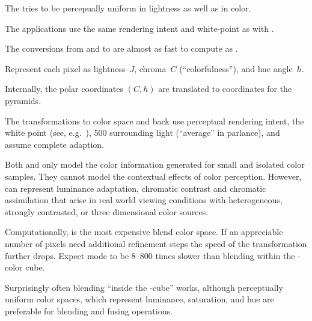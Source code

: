 \begin{description}
  The  tries to be percepually uniform
  in lightness as well as in color.

  The applications use the same rendering intent and white-point as with .

  The conversions from and to  are almost as fast to compute as
  .

\item[\urlmark{\wikipediaciecam}{\acronym{CIECAM02}}]\itemend\urltext
  Represent each pixel as lightness~$J$, chroma~$C$ (``colorfulness''), and hue
  angle~$h$.

  \begin{geeknote}
    Internally, the polar coordinates $(C, h)$ are translated to 
    coordinates for the pyramids.
  \end{geeknote}

  The transformations to  color space and back use perceptual rendering
  intent, the  white point (see, e.g.\ ), 500 surrounding light (``average'' in  parlance),
  and assume complete adaption.

  Both  and  only model the color information generated for
  small and isolated color samples.  They cannot model the contextual effects of color
  perception.  However,  can represent luminance adaptation, chromatic
  contrast and chromatic assimilation that arise in real world viewing conditions with
  heterogeneous, strongly contrasted, or three dimensional color sources.

  Computationally,  is the most expensive blend color space.  If an
  appreciable number of pixels need additional refinement steps the speed of the transformation
  further drops.  Expect  mode to be 8--800 times slower than blending within
  the -color cube.
\end{description}

\noindent Surprisingly often blending ``inside the -cube'' works, although
perceptually uniform color spaces, which represent luminance, saturation, and hue are preferable
for blending and fusing operations.


